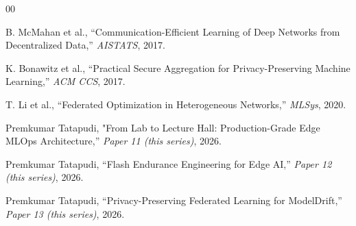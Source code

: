 \documentclass[conference]{IEEEtran}
\begin{document}
\begin{thebibliography}{00}

 B. McMahan et al., ``Communication-Efficient Learning of Deep Networks from Decentralized Data,'' \textit{AISTATS}, 2017.

 K. Bonawitz et al., ``Practical Secure Aggregation for Privacy-Preserving Machine Learning,'' \textit{ACM CCS}, 2017.


 T. Li et al., ``Federated Optimization in Heterogeneous Networks,'' \textit{MLSys}, 2020.

 Premkumar Tatapudi, "From Lab to Lecture Hall: Production-Grade Edge MLOps Architecture,'' \textit{Paper 11 (this series)}, 2026.

 Premkumar Tatapudi, ``Flash Endurance Engineering for Edge AI,'' \textit{Paper 12 (this series)}, 2026.

 Premkumar Tatapudi, ``Privacy-Preserving Federated Learning for ModelDrift,'' \textit{Paper 13 (this series)}, 2026.

\end{thebibliography}
\end{document}
